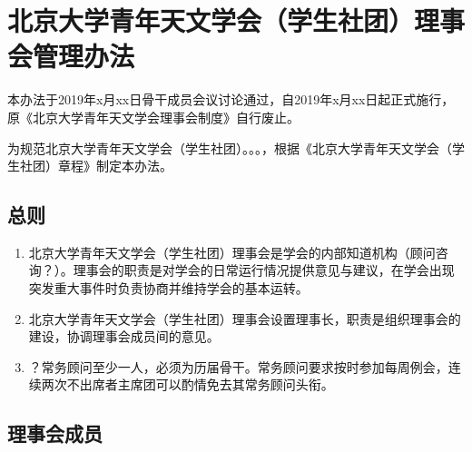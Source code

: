 \chapter{北京大学青年天文学会（学生社团）理事会管理办法}

本办法于2019年x月xx日骨干成员会议讨论通过，自2019年x月xx日起正式施行，原《北京大学青年天文学会理事会制度》自行废止。

为规范北京大学青年天文学会（学生社团）。。。，根据《北京大学青年天文学会（学生社团）章程》制定本办法。

\section{总则}

\begin{enumerate}
    \item 北京大学青年天文学会（学生社团）理事会是学会的内部知道机构（顾问咨询？）。理事会的职责是对学会的日常运行情况提供意见与建议，在学会出现突发重大事件时负责协商并维持学会的基本运转。
    
    \item 北京大学青年天文学会（学生社团）理事会设置理事长，职责是组织理事会的建设，协调理事会成员间的意见。
        
    \item ？常务顾问至少一人，必须为历届骨干。常务顾问要求按时参加每周例会，连续两次不出席者主席团可以酌情免去其常务顾问头衔。
\end{enumerate}

\section{理事会成员}

